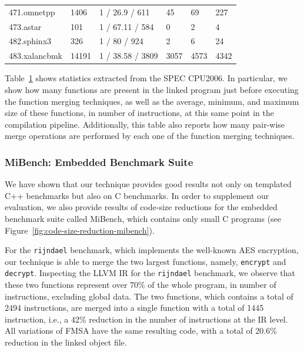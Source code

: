 \begin{table}[h]
{\begin{tabular}{llllll}
\rowcolor{evencolor} 471.omnetpp        & 1406   & 1 / 26.9 / 611     & 45     & 69    & 227    \\
                     473.astar          & 101    & 1 / 67.11 / 584    & 0      & 2     & 4      \\
\rowcolor{evencolor} 482.sphinx3        & 326    & 1 / 80 / 924       & 2      & 6     & 24     \\
                     483.xalancbmk      & 14191  & 1 / 38.58 / 3809   & 3057   & 4573  & 4342   \\
\bottomrule
\end{tabular}
}
\label{tab:stats}
\end{table}

Table~\ref{tab:stats} shows statistics extracted from the SPEC CPU2006.
In particular, we show how many functions are present in the linked program
just before executing the function merging techniques, as well as
the average, minimum, and maximum size of these functions, in number of instructions, at
this same point in the compilation pipeline.
Additionally, this table also reports how many pair-wise merge operations are
performed by each one of the function merging techniques.

\subsubsection*{MiBench: Embedded Benchmark Suite}

We have shown that our technique provides good results not only on templated C++
benchmarks but also on C benchmarks.
In order to supplement our evaluation, we also provide results of code-size
reductions for the embedded benchmark suite called MiBench, which contains only
small C programs (see Figure~\ref{fig:code-size-reduction-mibench}).

For the \texttt{rijndael} benchmark, which implements the well-known AES
encryption, our technique is able to merge the two largest functions, namely,
\texttt{encrypt} and \texttt{decrypt}.
Inspecting the LLVM IR for the \texttt{rijndael} benchmark, we observe that
these two functions represent over 70\% of the whole program, in number of
instructions, excluding global data.
The two functions, which contains a total of 2494 instructions, are merged into
a single function with a total of 1445 instruction, i.e., a 42\% reduction in
the number of instructions at the IR level. All variations of FMSA have the same
resulting code, with a total of 20.6\% reduction in the linked object file.

